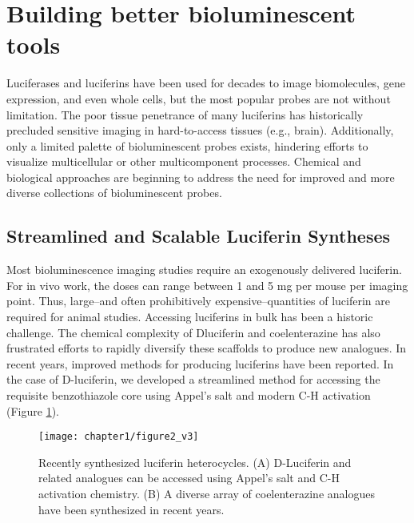 \section{Building better bioluminescent tools}
Luciferases and luciferins have been used for decades to image
biomolecules, gene expression, and even whole cells, but the
most popular probes are not without limitation.\cite{RN26} The poor
tissue penetrance of many luciferins has historically precluded
sensitive imaging in hard-to-access tissues (e.g., brain).
Additionally, only a limited palette of bioluminescent probes
exists, hindering efforts to visualize multicellular or other
multicomponent processes. Chemical and biological approaches
are beginning to address the need for improved and
more diverse collections of bioluminescent probes.
\subsection*{Streamlined and Scalable Luciferin Syntheses} 
Most bioluminescence imaging studies require an exogenously
delivered luciferin. For in vivo work, the doses can range
between 1 and 5 mg per mouse per imaging point. Thus,
large--and often prohibitively expensive--quantities of luciferin
are required for animal studies. Accessing luciferins in bulk
has been a historic challenge. The chemical complexity of Dluciferin
and coelenterazine has also frustrated efforts to rapidly
diversify these scaffolds to produce new analogues.
In recent years, improved methods for producing luciferins
have been reported. In the case of D-luciferin, we developed a
streamlined method for accessing the requisite benzothiazole
core using Appel's salt and modern C-H activation (Figure \ref{fig:luc_derivatives}).\cite{McCutcheon:2012ixb} 

\begin{figure}[htbp]
\texttt{[image: chapter1/figure2\_v3]}
\centering
\caption{Recently synthesized luciferin heterocycles. (A) D-Luciferin
and related analogues can be accessed using Appel's salt and C-H
activation chemistry. (B) A diverse array of coelenterazine analogues
have been synthesized in recent years.}
  \label{fig:luc_derivatives}
\end{figure}

